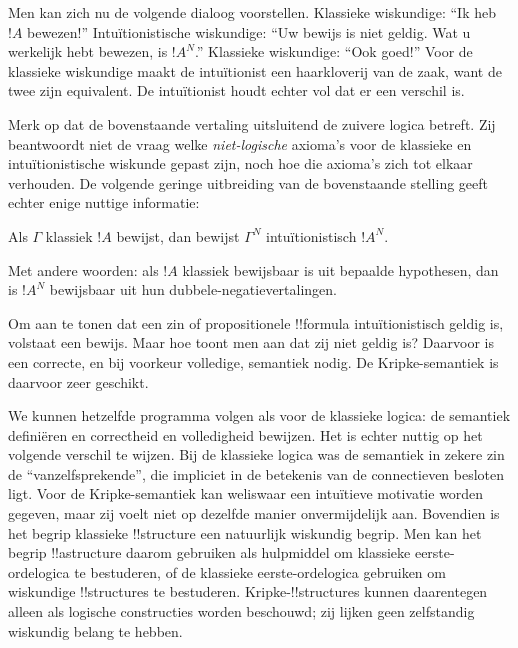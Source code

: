 \documentclass[../../../include/open-logic-section]{subfiles}
\begin{document}
Men kan zich nu de volgende dialoog voorstellen. Klassieke wiskundige: ``Ik heb
$!A$ bewezen!'' Intuïtionistische wiskundige: ``Uw bewijs is niet geldig. Wat u
werkelijk hebt bewezen, is $!A^N$.'' Klassieke wiskundige: ``Ook goed!'' Voor de
klassieke wiskundige maakt de intuïtionist een haarkloverij van de zaak, want de
twee zijn equivalent. De intuïtionist houdt echter vol dat er een verschil is.

Merk op dat de bovenstaande vertaling uitsluitend de zuivere logica betreft. Zij
beantwoordt niet de vraag welke \emph{niet-logische} axioma's voor de klassieke en
intuïtionistische wiskunde gepast zijn, noch hoe die axioma's zich tot elkaar
verhouden. De volgende geringe uitbreiding van de bovenstaande stelling geeft
echter enige nuttige informatie:

\begin{thm}
Als $\Gamma$ klassiek $!A$ bewijst, dan bewijst $\Gamma^N$
intuïtionistisch $!A^N$.
\end{thm}

Met andere woorden: als $!A$ klassiek bewijsbaar is uit bepaalde hypothesen, dan
is $!A^N$ bewijsbaar uit hun dubbele-negatievertalingen.

Om aan te tonen dat een zin of propositionele !!{formula} intuïtionistisch geldig
is, volstaat een bewijs. Maar hoe toont men aan dat zij niet geldig is? Daarvoor
is een correcte, en bij voorkeur volledige, semantiek nodig. De
Kripke-semantiek is daarvoor zeer geschikt.

We kunnen hetzelfde programma volgen als voor de klassieke logica: de semantiek
definiëren en correctheid en volledigheid bewijzen. Het is echter nuttig op het
volgende verschil te wijzen. Bij de klassieke logica was de semantiek in zekere
zin de ``vanzelfsprekende'', die impliciet in de betekenis van de connectieven
besloten ligt. Voor de Kripke-semantiek kan weliswaar een intuïtieve motivatie
worden gegeven, maar zij voelt niet op dezelfde manier onvermijdelijk aan.
Bovendien is het begrip klassieke !!{structure} een natuurlijk wiskundig begrip.
Men kan het begrip !!a{structure} daarom gebruiken als hulpmiddel om klassieke
eerste-ordelogica te bestuderen, of de klassieke eerste-ordelogica gebruiken om
wiskundige !!{structure}s te bestuderen. Kripke-!!{structure}s kunnen daarentegen
alleen als logische constructies worden beschouwd; zij lijken geen zelfstandig
wiskundig belang te hebben.
\end{document}
